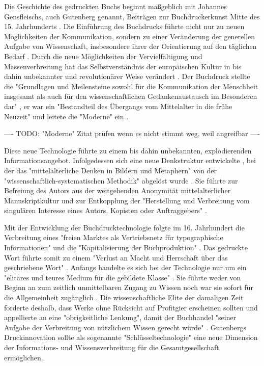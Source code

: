 Die Geschichte des gedruckten Buchs beginnt maßgeblich mit Johannes Gensfleischs, auch Gutenberg genannt, Beiträgen zur Buchdruckerkunst \cite{wittmann_1999_geschichte} Mitte des 15. Jahrhunderts \cite{suchen}. Die Einführung des Buchdrucks führte nicht nur zu neuen Möglichkeiten der Kommunikation, sondern zu einer Veränderung der generellen Aufgabe von Wissenschaft, insbesondere ihrer der Orientierung auf den täglichen Bedarf \cite{Luhmann1998}. Durch die neue Möglichkeiten der Vervielfältigung und Massenverbreitung hat das Selbstverständnis der europäischen Kultur in bis dahin unbekannter \cite{giesecke_1991_buchdruck} und revolutionärer Weise verändert \cite{wunderlich_2008_buchdruck}. Der Buchdruck stellte die "Grundlagen und Meilensteine sowohl für die Kommunikation der Menschheit insgesamt als auch für den wissenschaftlichen Gedankenaustausch im Besonderen dar" \cite{schirmbacher_2009_wisspub}, er war ein "Bestandteil des Übergangs vom Mittelalter in die frühe Neuzeit" \cite{lange2008medienwettbewerb} und leitete die "Moderne" ein \cite{luhmann_1997_gesellschaft}.

---- TODO: "Moderne" Zitat prüfen wenn es nicht stimmt weg, weil angreifbar ----

Diese neue Technologie führte zu einem bis dahin unbekannten, explodierenden Informationsangebot. Infolgedessen sich eine neue Denkstruktur entwickelte \cite{eisenstein_1997_druckerpresse}, bei der das "mittelalterliche Denken in Bildern und Metaphern" von der "wissenschaftlich-systematischen Methodik" abgelöst wurde \cite{wunderlich_2008_buchdruck}. Sie führte zur Befreiung des Autors aus der weitgehenden Anonymität mittelalterlicher Manuskriptkultur und zur Entkopplung der "Herstellung und Verbreitung vom singulären Interesse eines Autors, Kopisten oder Auftraggebers"\cite{wunderlich_2008_buchdruck} \cite{schirmbacher_2009_wisspub}.

Mit der Entwicklung der Buchdrucktechnologie folgte im 16. Jahrhundert die Verbreitung eines "freien Marktes als Vertriebsnetz für typographische Informationen"\cite{giesecke_1991_buchdruck} und die "Kapitalisierung der Buchproduktion" \cite{steiner_1998_autorenhonorar}. Das gedruckte Wort führte somit zu einem "Verlust an Macht und Herrschaft über das geschriebene Wort" \cite{wunderlich_2008_buchdruck}. Anfangs handelte es sich bei der Technologie nur um ein "elitäres und teures Medium für die gebildete Klasse" \cite{hartmann_2008_medien}. Sie führte weder von Beginn an zum zeitlich unmittelbaren Zugang zu Wissen noch war sie sofort für die Allgemeinheit zugänglich \cite{hartmann_2008_medien}. Die wissenschaftliche Elite der damaligen Zeit forderte deshalb, dass Werke ohne Rücksicht auf Profitgier erscheinen sollten und appellierte an eine "obrigkeitliche Lenkung", damit der Buchhandel "seiner Aufgabe der Verbreitung von nützlichem Wissen gerecht würde" \cite{wittmann_1999_geschichte}. Gutenbergs Druckinnovation sollte als sogenannte "Schlüsseltechnologie" \cite{jager_1993_theoretische} eine neue Dimension der Informations- und Wissensverbreitung für die Gesamtgesellschaft ermöglichen.

